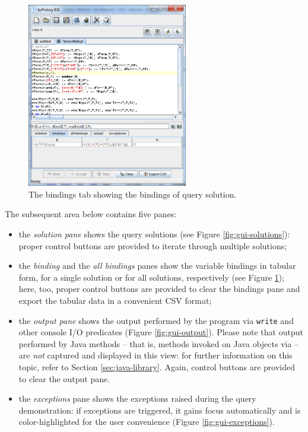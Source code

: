 \begin{figure}
\centering
\includegraphics[width=7cm]{images/gui-bindings}
\caption{The bindings tab showing the bindings of query solution.}
\label{fig:gui-bindings}
\end{figure}

The subsequent area below contains five panes:
%
\begin{itemize}
\item the \textit{solution pane} shows the query solutions (see Figure \ref{fig:gui-solutions}): proper control buttons are provided to iterate
    through multiple solutions;

\item the \textit{binding} and the \textit{all bindings} panes show the variable bindings in tabular form, for a single solution or for all solutions, respectively (see Figure \ref{fig:gui-bindings}); here, too, proper control buttons are provided to clear the bindings pane and export the tabular data in a convenient CSV format;

\item the \textit{output pane} shows the output performed by the program via \texttt{write} and other console I/O predicates (Figure \ref{fig:gui-output}).
    Please note that output performed by Java methods -- that is, methods invoked on Java objects via  -- are \textit{not} captured and displayed in this view: for further information on this topic, refer to Section \ref{sec:java-library}.
    Again, control buttons are provided to clear the output pane.

\item the \textit{exceptions} pane shows the exceptions raised during the query demonstration: if exceptions are triggered, it gains focus automatically and is color-highlighted for the user convenience (Figure \ref{fig:gui-exceptions}).
\end{itemize}

